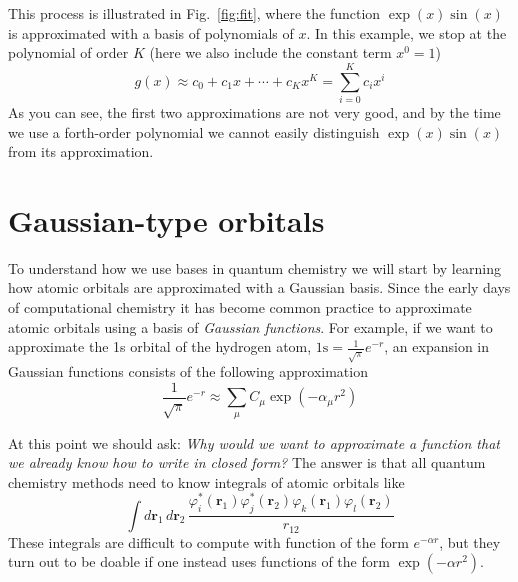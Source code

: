 \documentclass[../Main/notes.tex]{subfiles}
\begin{document}
This process is illustrated in Fig.~\ref{fig:fit}, where the function $\exp(x) \sin(x)$ is approximated with a basis of polynomials of $x$.
In this example, we stop at the polynomial of order $K$ (here we also include the constant term $x^0 = 1$)
\begin{equation}
g(x) \approx  c_0 +  c_1 x + \cdots + c_K x^{K} = \sum_{i=0}^{K} c_i x^{i}
\end{equation}
As you can see, the first two approximations are not very good, and by the time we use a forth-order polynomial we cannot easily distinguish $\exp(x) \sin(x)$ from its approximation.

\section{Gaussian-type orbitals}

To understand how we use bases in quantum chemistry we will start by learning how atomic orbitals are approximated with a Gaussian basis.
Since the early days of computational chemistry it has become common practice to approximate atomic orbitals using a basis of \emph{Gaussian functions}.
For example, if we want to approximate the 1s orbital of the hydrogen atom, $\mathrm{1s}=  \frac{1}{\sqrt{\pi}} e^{-r}$, an expansion in Gaussian functions consists of the following approximation
\begin{equation}
\frac{1}{\sqrt{\pi}} e^{-r} \approx \sum_\mu C_\mu \exp(- \alpha_\mu r^2)
\end{equation}

At this point we should ask: \emph{Why would we want to approximate a function that we already know how to write in closed form?}
The answer is that all quantum chemistry methods need to know integrals of atomic orbitals like
\begin{equation}
\int d\mathbf{r}_1 \, d\mathbf{r}_2 \, \frac{\varphi^*_i(\mathbf{r}_1) \varphi^*_j(\mathbf{r}_2) \varphi_k(\mathbf{r}_1) \varphi_l(\mathbf{r}_2)}{r_{12}}
\end{equation}
These integrals are difficult to compute with function of the form $e^{-\alpha r}$, but they turn out to be doable if one instead uses functions of the form $\exp(- \alpha r^2)$.
\end{document}
